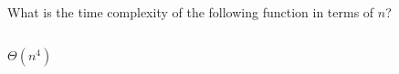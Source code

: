 \begin{prob}
    What is the time complexity of the following function in terms of $n$?

    \inputminted{python}{./code.py}

    \begin{soln}
        $\Theta(n^4)$
    \end{soln}

\end{prob}

